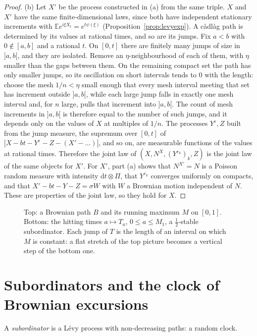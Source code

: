 \begin{proof}
(b) Let $X'$ be the process constructed in (a) from the same triple. $X$ and $X'$ have the same finite-dimensional laws, since both have independent stationary increments with $\mathbb Ee^{i\xi X_t}=e^{t\psi(\xi)}$ (Proposition~\ref{prop:levyexp}).
A c\`adl\`ag path is determined by its values at rational times, and so are its jumps. Fix $a<b$ with $0\notin[a,b]$ and a rational $t$. On $[0,t]$ there are finitely many jumps of size in $]a,b[$, and they are isolated. Remove an $\eta$-neighbourhood of each of them, with $\eta$ smaller than the gaps between them. On the remaining compact set the path has only smaller jumps, so its oscillation on short intervals tends to $0$ with the length: choose the mesh $1/n<\eta$ small enough that every mesh interval meeting that set has increment outside $]a,b[$, while each large jump falls in exactly one mesh interval and, for $n$ large, pulls that increment into $]a,b[$. The count of mesh increments in $]a,b[$ is therefore equal to the number of such jumps, and it depends only on the values of $X$ at multiples of $1/n$. The processes $Y^\varepsilon,Z$ built from the jump measure, the supremum over $[0,t]$ of $|X-bt-Y^{\varepsilon}-Z-(X'-\dots)|$, and so on, are measurable functions of the values at rational times. Therefore the
joint law of $(X,N^X,(Y^{\varepsilon_k})_k,Z)$ is the joint law of the same objects for $X'$. For $X'$, part (a) shows that $N^{X'}=N$ is a Poisson random measure with intensity $\mathrm dt\otimes\Pi$, that $Y^{\varepsilon_k}$
converges uniformly on compacts, and that $X'-bt-Y-Z=\sigma W$ with $W$ a Brownian motion independent of $N$. These are properties of the joint law, so they hold for $X$.
\end{proof}

\begin{figure}[ht]
\centering
{}
\caption{Top: a Brownian path $B$ and its running maximum $M$ on $[0,1]$. Bottom: the hitting times $a\mapsto T_a$, $0\le a\le M_1$, a $\frac12$-stable subordinator. Each jump of $T$ is the length of an interval on which $M$
is constant: a flat stretch of the top picture becomes a vertical step of the bottom one.}
\label{fig:subordinator}
\end{figure}

\section{Subordinators and the clock of Brownian excursions}

A \emph{subordinator} is a L\'evy process with non-decreasing paths: a random clock.

